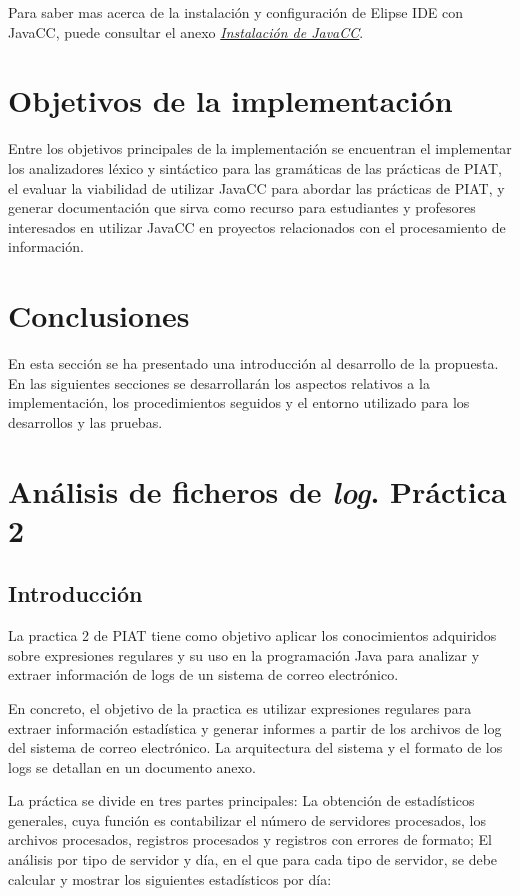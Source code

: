 Para saber mas acerca de la instalación y configuración de Elipse IDE con JavaCC, puede consultar el anexo \hyperref[sec:instalaciondejavacc]{\textit{Instalación de JavaCC}}.

\section{Objetivos de la implementación}
\noindent Entre los objetivos principales de la implementación se encuentran el implementar los analizadores léxico y sintáctico para las gramáticas de las prácticas de PIAT, el evaluar la viabilidad de utilizar JavaCC para abordar las prácticas de PIAT, y generar documentación que sirva como recurso para estudiantes y profesores interesados en utilizar JavaCC en proyectos relacionados con el procesamiento de información.

\section{Conclusiones}
\noindent En esta sección se ha presentado una introducción al desarrollo de la propuesta. En las siguientes secciones se desarrollarán los aspectos relativos a la implementación, los procedimientos seguidos y el entorno utilizado para los desarrollos y las pruebas.

\section{Análisis de ficheros de \textit{log}. Práctica 2}
\subsection{Introducción}

\noindent La practica 2 de PIAT tiene como objetivo aplicar los conocimientos adquiridos sobre expresiones regulares y su uso en la programación Java para analizar y extraer información de logs de un sistema de correo electrónico.

En concreto, el objetivo de la practica es utilizar expresiones regulares para extraer información estadística y generar informes a partir de los archivos de log del sistema de correo electrónico. La arquitectura del sistema y el formato de los logs se detallan en un documento anexo.

La práctica se divide en tres partes principales: La obtención de estadísticos generales, cuya función es contabilizar el número de servidores procesados, los  archivos procesados, registros procesados y registros con errores de formato; El análisis por tipo de servidor y día, en el que para cada tipo de servidor, se debe calcular y mostrar los siguientes estadísticos por día:

